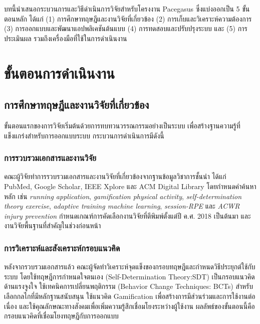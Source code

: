 
บทนี้นำเสนอกระบวนการและวิธีดำเนินการวิจัยสำหรับโครงงาน Pacegasus ซึ่งแบ่งออกเป็น 5 ขั้นตอนหลัก ได้แก่ (1) การศึกษาทฤษฎีและงานวิจัยที่เกี่ยวข้อง (2) การเก็บและวิเคราะห์ความต้องการ (3) การออกแบบและพัฒนาแอปพลิเคชันต้นแบบ (4) การทดสอบและปรับปรุงระบบ และ (5) การประเมินผล รวมถึงเครื่องมือที่ใช้ในการดำเนินงาน

\section{ขั้นตอนการดำเนินงาน}

\subsection{การศึกษาทฤษฎีและงานวิจัยที่เกี่ยวข้อง}

ขั้นตอนแรกของการวิจัยเริ่มต้นด้วยการทบทวนวรรณกรรมอย่างเป็นระบบ เพื่อสร้างฐานความรู้ที่แข็งแกร่งสำหรับการออกแบบระบบ กระบวนการดำเนินการมีดังนี้

\subsubsection{การรวบรวมเอกสารและงานวิจัย}

คณะผู้วิจัยทำการรวบรวมเอกสารและงานวิจัยที่เกี่ยวข้องจากฐานข้อมูลวิชาการชั้นนำ ได้แก่ PubMed, Google Scholar, IEEE Xplore และ ACM Digital Library โดยกำหนดคำค้นหาหลัก เช่น \textit{running application}, \textit{gamification physical activity}, \textit{self-determination theory exercise}, \textit{adaptive training machine learning}, \textit{session-RPE} และ \textit{ACWR injury prevention} กำหนดเกณฑ์การคัดเลือกงานวิจัยที่ตีพิมพ์ตั้งแต่ปี ค.ศ. 2018 เป็นต้นมา และงานวิจัยพื้นฐานที่สำคัญในช่วงก่อนหน้า

\subsubsection{การวิเคราะห์และสังเคราะห์กรอบแนวคิด}

หลังจากรวบรวมเอกสารแล้ว คณะผู้จัดทำวิเคราะห์จุดแข็งของกรอบทฤษฎีและกำหนดวิธีประยุกต์ใช้กับระบบ โดยใช้ทฤษฎีการกำหนดใจตนเอง (Self-Determination Theory:SDT) เป็นกรอบแนวคิดด้านแรงจูงใจ ใช้เทคนิคการเปลี่ยนพฤติกรรม (Behavior Change Techniques: BCTs) สำหรับเลือกกลไกที่มีหลักฐานสนับสนุน ใช้แนวคิด Gamification เพื่อสร้างการมีส่วนร่วมและการใช้งานต่อเนื่อง และใช้คุณลักษณะทางสังคมเพื่อเพิ่มความรู้สึกเชื่อมโยงระหว่างผู้ใช้งาน ผลลัพธ์ของขั้นตอนนี้คือกรอบแนวคิดที่เชื่อมโยงทฤษฎีกับการออกแบบ

